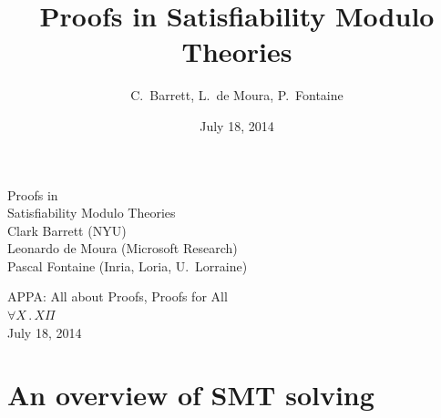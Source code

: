 \documentclass[svgnames,table,mathserif]{beamer}
\title{Proofs in Satisfiability Modulo Theories}
\author[]{C.~Barrett, L.~de Moura, P.~Fontaine}
\date{July 18, 2014}
\institute[]{%
}
\begin{document}

\begin{frame}

  \begin{center}

  {\huge Proofs in\\[8pt] Satisfiability Modulo Theories}\\

  \vspace*{20pt}
  Clark Barrett (NYU)\\[2pt]
  Leonardo de Moura (Microsoft Research)\\[2pt]
  Pascal Fontaine (Inria, Loria, U.\ Lorraine)

  \vspace*{10PT}\large
  APPA: All about Proofs, Proofs for All\\
  $\forall X\,.\,X\Pi$\\[5pt] July 18, 2014%
  \end{center}
\end{frame}




\section{An overview of SMT solving}
\end{document}
